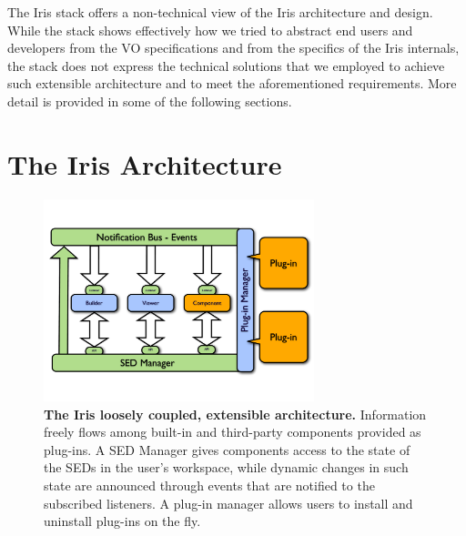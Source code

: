 \documentclass[preprint,authoryear,5p]{elsarticle}
\begin{document}
The Iris stack offers a non-technical view of the Iris architecture and design.
While the stack shows effectively how we tried to abstract end users and developers
from the VO specifications and from the specifics of the Iris internals, the stack does
not express the technical solutions that we employed to achieve such extensible
architecture and to meet the aforementioned requirements. More detail is
provided in some of the following sections.

\section{The Iris Architecture} \label{sec:architecture}

\begin{figure} \begin{center}
\includegraphics[width=0.7\textwidth]{IrisDiagrams.001.pdf}
\caption{\textbf{The Iris loosely coupled, extensible architecture.}  Information
freely flows among built-in and third-party components provided as plug-ins. A
SED Manager gives components access to the state of the SEDs in the user's
workspace, while dynamic changes in such state are announced through events that
are notified to the subscribed listeners. A plug-in manager allows users to
install and uninstall plug-ins on the fly.} \label{fig:architecture}
\end{center} \end{figure}
\end{document}
